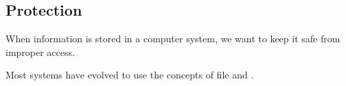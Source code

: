 \subsection{Protection}\label{subsec:File_Protection}
When information is stored in a computer system, we want to keep it safe from improper access.

Most systems have evolved to use the concepts of file  and .


